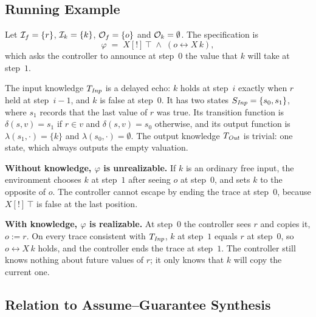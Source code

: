 \subsection{Running Example}
\begin{example}\label{ex:running}
Let $\mathcal{I}_{f} = \{r\}$, $\mathcal{I}_{k} = \{k\}$, $\mathcal{O}_{f} = \{o\}$ and $\mathcal{O}_{k} = \emptyset$.
The specification is
\[
  \varphi \;=\; X[!]\,\top \;\wedge\; (o \leftrightarrow X\,k),
\]
which asks the controller to announce at step~$0$ the value that $k$ will take at step~$1$.

The input knowledge $T_{\mathit{Inp}}$ is a delayed echo: $k$ holds at step~$i$ exactly when $r$ held at step~$i-1$, and $k$ is false at step~$0$.
It has two states $S_{\mathit{Inp}} = \{s_0, s_1\}$, where $s_1$ records that the last value of $r$ was true.
Its transition function is $\delta(s, v) = s_1$ if $r \in v$ and $\delta(s, v) = s_0$ otherwise, and its output function is $\lambda(s_1, \cdot) = \{k\}$ and $\lambda(s_0, \cdot) = \emptyset$.
The output knowledge $T_{\mathit{Out}}$ is trivial: one state, which always outputs the empty valuation.

\textbf{Without knowledge, $\varphi$ is unrealizable.}
If $k$ is an ordinary free input, the environment chooses $k$ at step~$1$ after seeing $o$ at step~$0$, and sets $k$ to the opposite of $o$.
The controller cannot escape by ending the trace at step~$0$, because $X[!]\,\top$ is false at the last position.

\textbf{With knowledge, $\varphi$ is realizable.}
At step~$0$ the controller sees $r$ and copies it, $o := r$.
On every trace consistent with $T_{\mathit{Inp}}$, $k$ at step~$1$ equals $r$ at step~$0$, so $o \leftrightarrow X\,k$ holds, and the controller ends the trace at step~$1$.
The controller still knows nothing about future values of $r$; it only knows that $k$ will copy the current one.
\end{example}

\subsection{Relation to Assume--Guarantee Synthesis}

